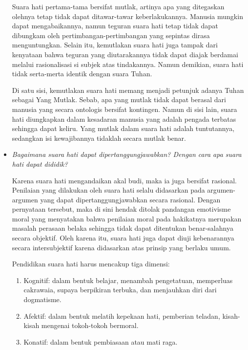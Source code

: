 \documentclass[10pt,a4paper]{article}
\def\tightlist{}
\begin{document}
\begin{multicols}{2}
\begin{itemize}
  Suara hati pertama-tama bersifat mutlak, artinya apa yang ditegaskan
  olehnya tetap tidak dapat ditawar-tawar keberlakukannya. Manusia
  mungkin dapat mengabaikannya, namun teguran suara hati tetap tidak
  dapat dibungkam oleh pertimbangan-pertimbangan yang sepintas dirasa
  menguntungkan. Selain itu, kemutlakan suara hati juga tampak dari
  kenyataan bahwa teguran yang diutarakannya tidak dapat diajak berdamai
  melalui rasionalisasi si subjek atas tindakannya. Namun demikian,
  suara hati tidak serta-merta identik dengan suara Tuhan.

  Di satu sisi, kemutlakan suara hati memang menjadi petunjuk adanya
  Tuhan sebagai Yang Mutlak. Sebab, apa yang mutlak tidak dapat berasal
  dari manusia yang secara ontologis bersifat kontingen. Namun di sisi
  lain, suara hati diungkapkan dalam kesadaran manusia yang adalah
  pengada terbatas sehingga dapat keliru. Yang mutlak dalam suara hati
  adalah tuntutannya, sedangkan isi kewajibannya tidaklah secara mutlak
  benar.
\item
  \emph{Bagaimana suara hati dapat dipertanggungjawabkan? Dengan cara
  apa suara hati dapat dididik?}

  Karena suara hati mengandaikan akal budi, maka ia juga bersifat
  rasional. Penilaian yang dilakukan oleh suara hati selalu didasarkan
  pada argumen-argumen yang dapat dipertanggungjawabkan secara rasional.
  Dengan pernyataan tersebut, maka di sini hendak ditolak pandangan
  emotivisme moral yang menyatakan bahwa penilaian moral pada hakikatnya
  merupakan masalah perasaan belaka sehingga tidak dapat ditentukan
  benar-salahnya secara objektif. Oleh karena itu, suara hati juga dapat
  diuji kebenarannya secara intersubjektif karena didasarkan atas
  prinsip yang berlaku umum.

  Pendidikan suara hati harus mencakup tiga dimensi:

  \begin{enumerate}
  \def\labelenumi{\arabic{enumi}.}
  \tightlist
  \item
    Kognitif: dalam bentuk belajar, menambah pengetatuan, memperluas
    cakrawaia, supaya berpikiran terbuka, dan menjauhkan diri dari
    dogmatisme.
  \item
    Afektif: dalam bentuk melatih kepekaan hati, pemberian teladan,
    kisah-kisah mengenai tokoh-tokoh bermoral.
  \item
    Konatif: dalam bentuk pembiasaan atau mati raga.
  \end{enumerate}
\end{itemize}


\end{multicols}
\end{document}
